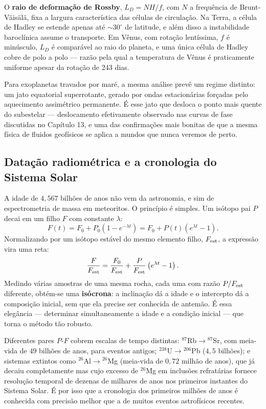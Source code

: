 \documentclass[11pt,a4paper]{article}
\begin{document}
O \textbf{raio de deformação de Rossby}, $L_D=NH/f$, com $N$ a frequência de Brunt-Väisälä, fixa a largura característica das células de circulação. Na Terra, a célula de Hadley se estende apenas até $\sim30^\circ$ de latitude, e além disso a instabilidade baroclínica assume o transporte. Em Vênus, com rotação lentíssima, $f$ é minúsculo, $L_D$ é comparável ao raio do planeta, e uma única célula de Hadley cobre de polo a polo --- razão pela qual a temperatura de Vênus é praticamente uniforme apesar da rotação de 243 dias.

Para exoplanetas travados por maré, a mesma análise prevê um regime distinto: um jato equatorial superrotante, gerado por ondas estacionárias forçadas pelo aquecimento assimétrico permanente. É esse jato que desloca o ponto mais quente do subestelar --- deslocamento efetivamente observado nas curvas de fase discutidas no Capítulo 13, e uma das confirmações mais bonitas de que a mesma física de fluidos geofísicos se aplica a mundos que nunca veremos de perto.

\subsection*{Datação radiométrica e a cronologia do Sistema Solar}

A idade de $4{,}567$ bilhões de anos não vem da astronomia, e sim de espectrometria de massa em meteoritos. O princípio é simples. Um isótopo pai $P$ decai em um filho $F$ com constante $\lambda$:
\[
F(t)=F_0+P_0\left(1-e^{-\lambda t}\right)=F_0+P(t)\left(e^{\lambda t}-1\right).
\]
Normalizando por um isótopo estável do mesmo elemento filho, $F_{\rm est}$, a expressão vira uma reta:
\[
\frac{F}{F_{\rm est}}=\frac{F_0}{F_{\rm est}}+\frac{P}{F_{\rm est}}\left(e^{\lambda t}-1\right).
\]
Medindo várias amostras de uma mesma rocha, cada uma com razão $P/F_{\rm est}$ diferente, obtém-se uma \textbf{isócrona}: a inclinação dá a idade e o intercepto dá a composição inicial, sem que ela precise ser conhecida de antemão. É essa elegância --- determinar simultaneamente a idade e a condição inicial --- que torna o método tão robusto.

Diferentes pares $P$-$F$ cobrem escalas de tempo distintas: $^{87}$Rb$\to{}^{87}$Sr, com meia-vida de $49$ bilhões de anos, para eventos antigos; $^{238}$U$\to{}^{206}$Pb ($4{,}5$ bilhões); e sistemas extintos como $^{26}$Al$\to{}^{26}$Mg (meia-vida de $0{,}72$ milhão de anos), que já decaiu completamente mas cujo excesso de $^{26}$Mg em inclusões refratárias fornece resolução temporal de dezenas de milhares de anos nos primeiros instantes do Sistema Solar. É por isso que a cronologia dos primeiros milhões de anos é conhecida com precisão melhor que a de muitos eventos astrofísicos recentes.
\end{document}

